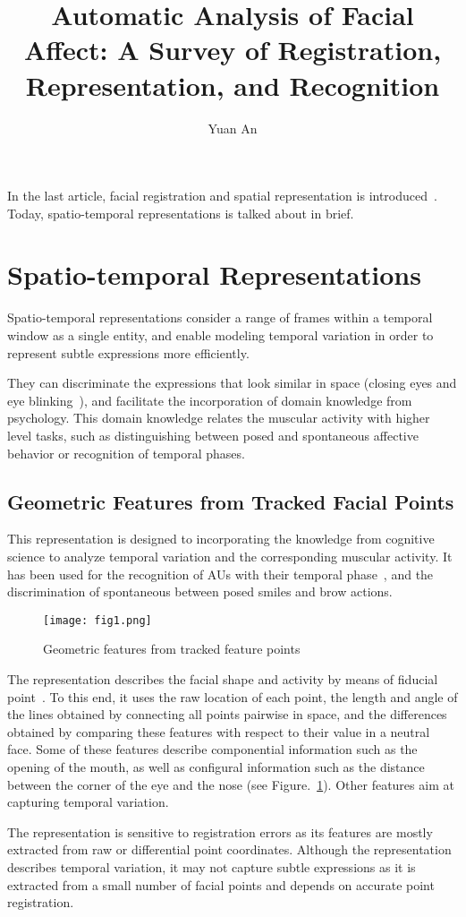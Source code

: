 \documentclass[10pt,twocolumn,letterpaper]{article}
\begin{document}
	\title{Automatic Analysis of Facial Affect: A Survey of Registration, Representation, and Recognition}	
	\author{Yuan An}
	\maketitle
	In the last article, facial registration and spatial representation is introduced~\cite{Auto}. Today, spatio-temporal representations is talked about in brief.
	\section*{Spatio-temporal Representations}
	Spatio-temporal representations consider a range of frames within a temporal window as a single entity, and enable modeling temporal variation in order to represent subtle expressions more efficiently. 
	\par
	They can discriminate the expressions that look similar in space (\eg closing eyes and eye blinking~\cite{Koelstra2010A,Sebastian}), and facilitate the incorporation of domain knowledge from psychology. This domain knowledge relates the muscular activity with higher level tasks, such as distinguishing between posed and spontaneous affective behavior or recognition of temporal phases. 
	\subsection*{Geometric Features from Tracked Facial Points}
	This representation is designed to incorporating the knowledge from cognitive science to analyze temporal variation and the corresponding muscular activity. It has been used for the recognition of AUs with their temporal phase~\cite{Valstar}, and the discrimination of spontaneous between posed smiles and brow actions.
	\begin{figure}[h]
		\centering
		\texttt{[image: fig1.png]}
		\caption{Geometric features from tracked feature points} \label{fig1}
	\end{figure}
	\par
	The representation describes the facial shape and activity by means of fiducial point~\cite{Valstar}. To this end, it uses the raw location of each point, the length and angle of the lines obtained by connecting all points pairwise in space, and the differences obtained by comparing these features with respect to their value in a neutral face. Some of these features describe componential information such as the opening of the mouth, as well as configural information such as the distance between the corner of the eye and the nose (see Figure.~\ref{fig1}). Other features aim at capturing temporal variation.
	\par
	The representation is sensitive to registration errors as its features are mostly extracted from raw or differential point coordinates. Although the representation describes temporal variation, it may not capture subtle expressions as it is extracted from a small number of facial points and depends on accurate point registration.
\end{document}
